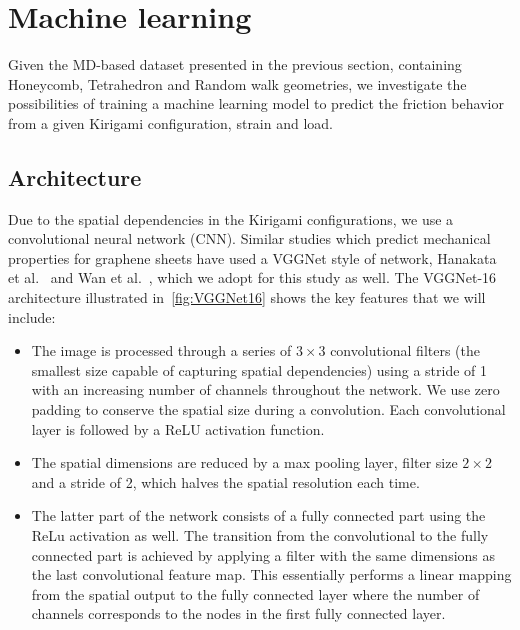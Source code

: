 \section{Machine learning}\label{eq:ML}
Given the \acrshort{MD}-based dataset presented in the previous section, containing Honeycomb, Tetrahedron and Random walk geometries, we investigate the possibilities of training a machine learning model to predict the friction behavior from a given Kirigami configuration, strain and load. 

\subsection{Architecture}
Due to the spatial dependencies in the Kirigami configurations, we use a convolutional neural network (\acrshort{CNN}). Similar studies which predict mechanical properties for graphene sheets have used a VGGNet style of network, Hanakata et al.~\cite{PhysRevLett.121.255304, PhysRevResearch.2.042006} and Wan et al.~\cite{graphene/hBN}, which we adopt for this study as well. The VGGNet-16 architecture illustrated in~\cref{fig:VGGNet16} shows the key features that we will include:
\begin{itemize}
  \item The image is processed through a series of $3 \times 3$ convolutional filters (the smallest size capable of capturing spatial dependencies) using a stride of 1 with an increasing number of channels throughout the network. We use zero padding to conserve the spatial size during a convolution. Each convolutional layer is followed by a ReLU activation function. 
  \item The spatial dimensions are reduced by a max pooling layer, filter size $2 \times 2$ and a stride of 2, which halves the spatial resolution each time. 
  \item The latter part of the network consists of a fully connected part using the ReLu activation as well. The transition from the convolutional to the fully connected part is achieved by applying a filter with the same dimensions as the last convolutional feature map. This essentially performs a linear mapping from the spatial output to the fully connected layer where the number of channels corresponds to the nodes in the first fully connected layer.
\end{itemize}

